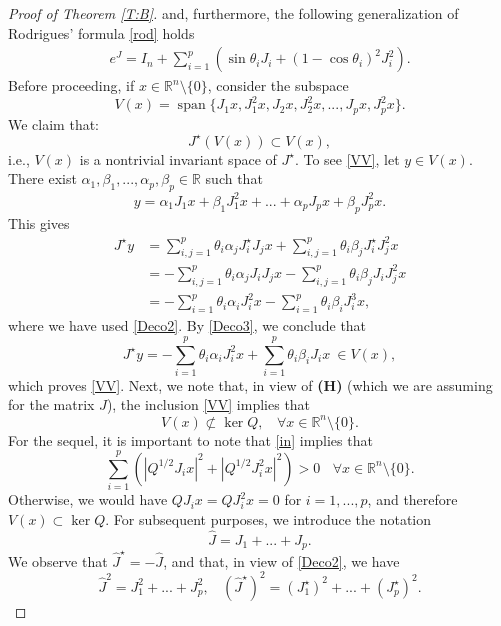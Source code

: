 \documentclass[11pt,letter]{amsart}
\def \R {\mathbb{R}}
\newcommand{\Rn}{\mathbb R^n}
\numberwithin{equation}{section}
\numberwithin{equation}{section}
\begin{document}
\begin{proof}[Proof of Theorem \ref{T:B}]
and, furthermore, the following generalization of Rodrigues' formula \eqref{rod} holds
\begin{align}\label{DecoExpo}
e^{J}=I_{n}+\sum_{i=1}^{p}(\sin \theta_{i} J_{i}+(1-\cos \theta_{i})^{2}J_{i}^{2}).
\end{align}
Before proceeding, if $x\in \Rn\setminus\{0\}$, consider the subspace
\[
V(x) = \operatorname{span}\{J_{1}x,J_{1}^{2}x,J_{2}x,J_{2}^{2}x,...,J_{p}x,J_{p}^{2}x\}.
\] 
We claim that:
\begin{equation}\label{VV}
J^\star(V(x))\subset V(x),
\end{equation}
i.e., $V(x)$ is a nontrivial invariant space of $J^\star$. To see \eqref{VV}, let $y\in V(x)$. There exist $ \alpha_1,\beta_1,...,\alpha_p,\beta_p\in \R$ such that
\[
y = \alpha_1 J_1 x + \beta_1 J_1^2 x + ... + \alpha_p J_p x + \beta_p J_p^2 x.
\]
This gives
\begin{align*}
J^\star y & = \sum_{i,j=1}^p \theta_i \alpha_j  J^\star_i J_j x + \sum_{i,j=1}^p \theta_i \beta_j  J^\star_i J^2_j x 
\\
& = - \sum_{i,j=1}^p \theta_i \alpha_j  J_i J_j x - \sum_{i,j=1}^p \theta_i \beta_j  J_i J^2_j x 
\\
& = - \sum_{i=1}^p \theta_i \alpha_i  J_i^2 x - \sum_{i=1}^p \theta_i \beta_i  J_i^3 x,
\end{align*}
where we have used \eqref{Deco2}. By \eqref{Deco3}, we conclude that 
\[
J^\star y = - \sum_{i=1}^p \theta_i \alpha_i  J_i^2 x + \sum_{i=1}^p \theta_i \beta_i  J_i x\ \in V(x),
\]
which proves \eqref{VV}. Next, we note that, in view of \textbf{(H)} (which we are assuming for the matrix $J$), the inclusion \eqref{VV} implies that 
\begin{equation}\label{in}
V(x) \not\subset \ker Q,\ \ \ \ \forall x\in \Rn\setminus\{0\}.
\end{equation}
For the sequel, it is important to note that \eqref{in} implies that
\begin{equation}\label{inn}
\sum_{i=1}^{p}(|Q^{1/2} J_{i}x|^2 + |Q^{1/2} J_i^2 x|^2) > 0\ \ \ \ \forall x\in\Rn\setminus\{0\}.
\end{equation}
Otherwise, we would have $Q J_i x = Q J_i^2 x = 0$ for $i=1,...,p$, and therefore $V(x)\subset \ker Q$.
For subsequent purposes, we introduce the notation 
\[
\hat{J}=J_{1}+...+J_{p}.
\] 
We observe that $\hat J^\star = - \hat J$, and that, in view of \eqref{Deco2}, we have
\begin{equation}\label{hat2}
\hat{J}^{2}=J_{1}^{2}+...+J_{p}^{2},\ \ \ \ (\hat{J}^\star)^{2}=(J^\star_{1})^{2}+...+(J^\star_{p})^{2}.

\end{equation}
\end{proof}
\end{document}
